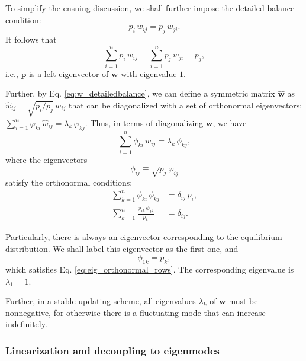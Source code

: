\documentclass[reprint, floatfix]{revtex4-1}
\begin{document}
To simplify the ensuing discussion,
we shall further impose the
detailed balance condition:
%
\begin{equation}
  p_i \, w_{ij} = p_j \, w_{ji}.
  \label{eq:w_detailedbalance}
\end{equation}
%
It follows that
\begin{equation}
  \sum_{i = 1}^n p_i \, w_{ij}
  =
  \sum_{i = 1}^n p_j \, w_{ji}
  = p_j,
  \label{eq:w_balance}
\end{equation}
%
i.e., $\mathbf p$ is a left eigenvector of
$\mathbf w$ with eigenvalue $1$.



Further, by Eq. \eqref{eq:w_detailedbalance},
we can define a symmetric matrix $\hat{\mathbf w}$
as $\hat w_{ij} = \sqrt{p_i/p_j} \, w_{ij}$
that can be diagonalized\cite{vankampen}
with a set of orthonormal eigenvectors:
%
$\sum_{i = 1}^n \varphi_{ki} \, \hat w_{ij} = \lambda_k \, \varphi_{kj}$.
%
Thus,
in terms of diagonalizing $\mathbf w$, we have
\begin{equation}
  \sum_{i = 1}^n \phi_{ki} \, w_{ij} = \lambda_k \, \phi_{kj},
  \label{eq:eig_w}
\end{equation}
where the eigenvectors
$$\phi_{ij} \equiv \sqrt{p_j} \, \varphi_{ij}$$
satisfy the orthonormal conditions\cite{vankampen}:
%
\begin{align}
\sum_{k = 1}^n \phi_{ki} \, \phi_{kj}
&= \delta_{ij} \, p_i,
\label{eq:eig_orthonormal_cols}
\\
\sum_{k = 1}^n \frac{ \phi_{ik} \, \phi_{jk} }{ p_k }
&= \delta_{ij}.
\label{eq:eig_orthonormal_rows}
\end{align}


Particularly, there is always an eigenvector
corresponding to the equilibrium distribution.
%
We shall label this eigenvector as the first one,
and
%
\begin{equation}
\phi_{1k} = p_k,
\label{eq:eigenmode1}
\end{equation}
%
which satisfies Eq. \eqref{eq:eig_orthonormal_rows}.
%
The corresponding eigenvalue is $\lambda_1 = 1$.

Further, in a stable updating scheme,
all eigenvalues $\lambda_k$ of $\mathbf w$
must be nonnegative,
for otherwise there is a fluctuating mode
that can increase indefinitely.




\subsubsection{Linearization and decoupling to eigenmodes}
\end{document}
